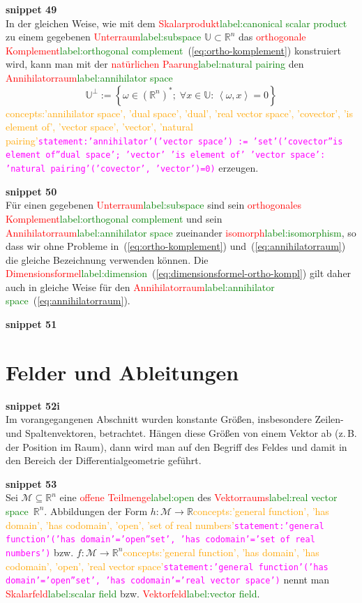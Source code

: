 \documentclass[a4paper,twoside,english,ngerman,deutsch,german,sectrefs,envcountsame,envcountchap]{svmono}
\newcommand{\setref}[2]{\textcolor{red}{#1}\textcolor{green}{#2}}
\newcommand{\snippet}[1]{\textbf{snippet #1}\\}
\newcommand{\eqnote}[2]{\textcolor{orange}{#1}\textcolor{magenta}{\texttt{#2}}}
\begin{document}
\snippet{49}
In der gleichen Weise, wie mit dem \setref{Skalarprodukt}{label:canonical scalar product} zu einem gegebenen \setref{Unterraum}{label:subspace} $\mathbb{U}\subset{\mathbb{R}}^{n}$ das \setref{orthogonale Komplement}{label:orthogonal complement}~(\eqref{eq:ortho-komplement}) konstruiert wird, kann man mit der \setref{natürlichen Paarung}{label:natural pairing} den \setref{Annihilatorraum}{label:annihilator space}
\begin{equation}
\mathbb{U}^{\perp}:=\left\{ \omega\in({\mathbb{R}}^{n})^{*};\;\forall x\in\mathbb{U}:\,\left\langle \omega,x\right\rangle =0\right\} \label{eq:annihilatorraum}
\end{equation}\eqnote{concepts:'annihilator space', 'dual space', 'dual', 'real vector space', 'covector', 'is element of', 'vector space', 'vector', 'natural pairing'}{statement:'annihilator'('vector space') := 'set'('covector''is element of''dual space'; 'vector' 'is element of' 'vector space': 'natural pairing'('covector', 'vector')=0)}
erzeugen.

\snippet{50}
Für einen gegebenen \setref{Unterraum}{label:subspace} sind sein \setref{orthogonales Komplement}{label:orthogonal complement} und sein \setref{Annihilatorraum}{label:annihilator space} zueinander \setref{isomorph}{label:isomorphism}, so dass wir ohne Probleme in~(\eqref{eq:ortho-komplement}) und~(\eqref{eq:annihilatorraum}) die gleiche Bezeichnung verwenden können. Die \setref{Dimensionsformel}{label:dimension}~(\eqref{eq:dimensionsformel-ortho-kompl}) gilt daher auch in gleiche Weise für den \setref{Annihilatorraum}{label:annihilator space}~(\eqref{eq:annihilatorraum}).

\snippet{51}
\section{Felder und Ableitungen\label{sec:Felder-und-Ableitungen}}

\snippet{52i}
Im vorangegangenen Abschnitt wurden konstante Größen, insbesondere
Zeilen- und Spaltenvektoren, betrachtet. Hängen diese Größen von einem
Vektor ab (z.\,B. der Position im Raum), dann wird man auf den Begriff
des Feldes und damit in den Bereich der Differentialgeometrie geführt.

\snippet{53}
Sei $\mathcal{M}\subseteq{\mathbb{R}}^{n}$ eine \setref{offene Teilmenge}{label:open} des \setref{Vektorraums}{label:real vector space}~${\mathbb{R}}^{n}$.
Abbildungen der Form $h:\mathcal{M}\to{\mathbb{R}}$\eqnote{concepts:'general function', 'has domain', 'has codomain', 'open', 'set of real numbers'}{statement:'general function'('has domain'='open''set', 'has codomain'='set of real numbers')} bzw. $f:\mathcal{M}\to{\mathbb{R}}^{n}$\eqnote{concepts:'general function', 'has domain', 'has codomain', 'open', 'real vector space'}{statement:'general function'('has domain'='open''set', 'has codomain'='real vector space')}
nennt man \setref{Skalarfeld}{label:scalar field} bzw. \setref{Vektorfeld}{label:vector field}.
\end{document}
